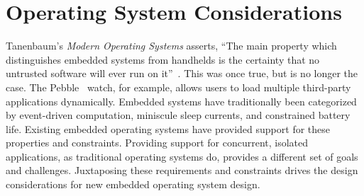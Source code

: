 \section{Operating System Considerations}
\label{os-considerations}

Tanenbaum's \emph{Modern Operating Systems} asserts, ``The main property which
distinguishes embedded systems from handhelds is the certainty that no untrusted
software will ever run on it''~\cite{tanenbaum}. This was once true, but is no
longer the case. The Pebble~\cite{pebble} watch, for example, allows users to
load multiple third-party applications dynamically.
Embedded systems have traditionally been categorized by event-driven computation,
miniscule sleep currents, and constrained battery life. Existing embedded operating systems
have provided support for these properties and constraints. Providing support for concurrent, isolated
applications, as traditional operating systems do, provides a different set
of goals and challenges.
Juxtaposing these requirements and constraints drives the design considerations
for new embedded operating system design.


%


